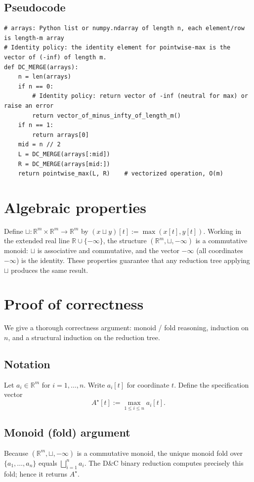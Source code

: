\documentclass[11pt]{article}
\begin{document}
\subsection{Pseudocode}
\begin{verbatim}
# arrays: Python list or numpy.ndarray of length n, each element/row is length-m array
# Identity policy: the identity element for pointwise-max is the vector of (-inf) of length m.
def DC_MERGE(arrays):
    n = len(arrays)
    if n == 0:
        # Identity policy: return vector of -inf (neutral for max) or raise an error
        return vector_of_minus_infty_of_length_m()
    if n == 1:
        return arrays[0]
    mid = n // 2
    L = DC_MERGE(arrays[:mid])
    R = DC_MERGE(arrays[mid:])
    return pointwise_max(L, R)    # vectorized operation, O(m)
\end{verbatim}

\section{Algebraic properties}
Define \(\sqcup:\mathbb{R}^m\times\mathbb{R}^m\to\mathbb{R}^m\) by \((x\sqcup y)[t] := \max(x[t],y[t])\). Working in the extended real line \(\mathbb{R}\cup\{-\infty\}\), the structure \((\mathbb{R}^m,\sqcup,\mathbf{-\infty})\) is a commutative monoid: \(\sqcup\) is associative and commutative, and the vector \(\mathbf{-\infty}\) (all coordinates \(-\infty\)) is the identity. These properties guarantee that any reduction tree applying \(\sqcup\) produces the same result.

\section{Proof of correctness}
We give a thorough correctness argument: monoid / fold reasoning, induction on \(n\), and a structural induction on the reduction tree.

\subsection{Notation}
Let \(a_i\in\mathbb{R}^m\) for \(i=1,\dots,n\). Write \(a_i[t]\) for coordinate \(t\). Define the specification vector
\[
A^\star[t] := \max_{1\le i\le n} a_i[t].
\]

\subsection{Monoid (fold) argument}
Because \((\mathbb{R}^m,\sqcup,\mathbf{-\infty})\) is a commutative monoid, the unique monoid fold over \(\{a_1,\dots,a_n\}\) equals \(\bigsqcup_{i=1}^n a_i\). The D\&C binary reduction computes precisely this fold; hence it returns \(A^\star\).
\end{document}
